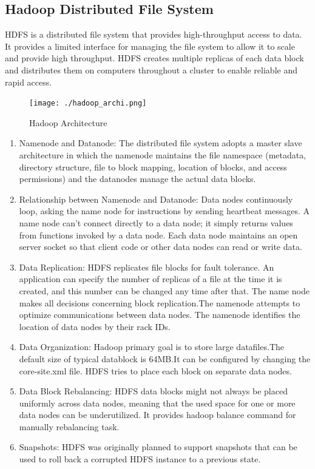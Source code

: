 \documentclass[12pt]{book}
\begin{document}
\subsection{Hadoop Distributed File System}
HDFS is a distributed file system that provides high-throughput access to data.
It provides a limited interface for managing the file system to allow it to scale and provide high throughput. 
HDFS creates multiple replicas of each data block and distributes them on computers throughout a cluster to enable reliable and rapid access.\cite{Features}\\
\begin{figure}[hb]
 \centering
 \texttt{[image: ./hadoop\_archi.png]}
 \caption{Hadoop Architecture } 
\end{figure}
\begin{enumerate}
\item Namenode and Datanode:
The distributed file system adopts a master slave architecture in which
the namenode maintains the file namespace (metadata, directory structure, file to block
mapping, location of blocks, and access permissions) and the datanodes manage the actual data
blocks.
\item Relationship between Namenode and Datanode:
Data nodes continuously loop, asking the name node for instructions by sending heartbeat messages. 
A name node can't connect directly to a data node; it simply returns values from functions invoked by a data node.
Each data node maintains an open server socket so that client code or other data nodes can read or write data.

\item Data Replication:
HDFS replicates file blocks for fault tolerance. An application can specify the number of replicas of a file at the time it is created, and this number can be changed any time after that. 
The name node makes all decisions concerning block replication.The namenode attempts to optimize communications between data nodes. The namenode identifies the location of data nodes by their rack IDs. 

\item Data Organization:
Hadoop primary goal is to store large datafiles.The default size of typical datablock is 64MB.It can be configured by changing the core-site.xml file.
HDFS tries to place each block on separate data nodes.

\item Data Block Rebalancing:
HDFS data blocks might not always be placed uniformly across data nodes,
meaning that the used space for one or more data nodes can be underutilized.
It provides hadoop balance command for manually rebalancing task.

\item Snapshots:
HDFS was originally planned to support snapshots that can be used to roll back a corrupted HDFS instance to a previous state.
\end{enumerate}
\end{document}
